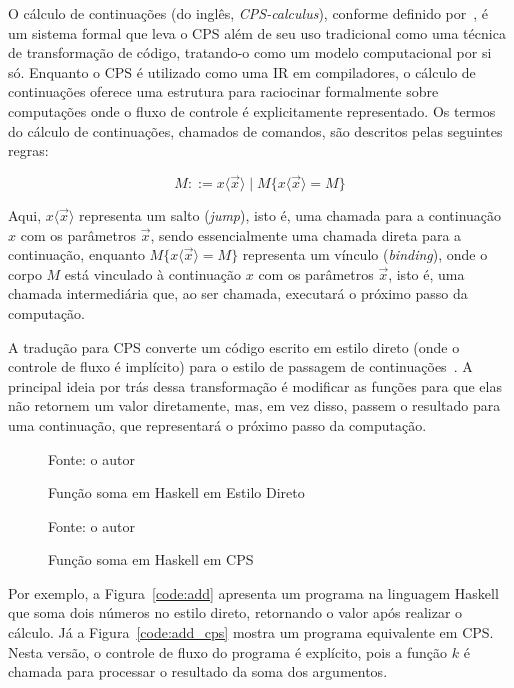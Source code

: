 O cálculo de continuações (do inglês, \textit{CPS-calculus}), conforme definido por~, é um sistema formal que leva o CPS além de seu uso tradicional como uma técnica de transformação de código, tratando-o como um modelo computacional por si só.
Enquanto o CPS é utilizado como uma IR em compiladores, o cálculo de continuações oferece uma estrutura para raciocinar formalmente sobre computações onde o fluxo de controle é explicitamente representado.
Os termos do cálculo de continuações, chamados de comandos, são descritos pelas seguintes regras:

\begin{equation}
  M ::= x\langle \vec{x} \rangle \mid M\{x\langle \vec{x} \rangle = M\}
\end{equation}

Aqui, $x\langle \vec{x} \rangle$ representa um salto (\textit{jump}), isto é, uma chamada para a continuação $x$ com os parâmetros $\vec{x}$, sendo essencialmente uma chamada direta para a continuação, enquanto $M\{x\langle \vec{x} \rangle = M\}$ representa um vínculo (\textit{binding}), onde o corpo $M$ está vinculado à continuação $x$ com os parâmetros $\vec{x}$, isto é, uma chamada intermediária que, ao ser chamada, executará o próximo passo da computação.

A tradução para CPS converte um código escrito em estilo direto (onde o controle de fluxo é implícito) para o estilo de passagem de continuações~\cite{FLANAGAN1993}.
A principal ideia por trás dessa transformação é modificar as funções para que elas não retornem um valor diretamente, mas, em vez disso, passem o resultado para uma continuação, que representará o próximo passo da computação.

\begin{figure}
  \caption{Função soma em Haskell em Estilo Direto}
  \small{Fonte: o autor}
  
\end{figure}

\begin{figure}
  \caption{Função soma em Haskell em CPS}
  \small{Fonte: o autor}
  
\end{figure}

Por exemplo, a Figura~\ref{code:add} apresenta um programa na linguagem Haskell que soma dois números no estilo direto, retornando o valor após realizar o cálculo.
Já a Figura~\ref{code:add_cps} mostra um programa equivalente em CPS\@.
Nesta versão, o controle de fluxo do programa é explícito, pois a função $k$ é chamada para processar o resultado da soma dos argumentos.

